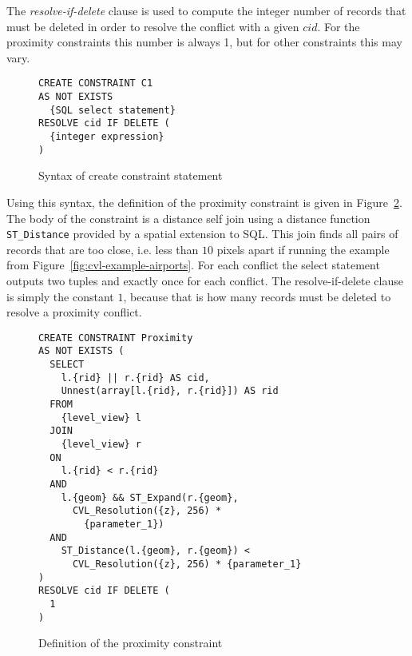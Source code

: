 The \emph{resolve-if-delete} clause is used to compute the integer number of records that must be deleted in order to resolve the conflict with a given $cid$. For the proximity constraints this number is always 1, but for other constraints this may vary.

\begin{figure}[htbp]
\begin{center}
\begin{lstlisting}
CREATE CONSTRAINT C1
AS NOT EXISTS
  {SQL select statement}
RESOLVE cid IF DELETE (
  {integer expression}
)
\end{lstlisting}
\caption{Syntax of create constraint statement}
\label{fig:create-constraint-syntax}
\end{center}
\end{figure}

Using this syntax, the definition of the proximity constraint is given in Figure~\ref{fig:proximity-definition}. The body of the constraint is a distance self join using a distance function \texttt{ST\_Distance} provided by a spatial extension to SQL. This join finds all pairs of records that are too close, i.e. less than $10$ pixels apart if running the example from Figure~\ref{fig:cvl-example-airports}. For each conflict the select statement outputs two tuples and exactly once for each conflict. The resolve-if-delete clause is simply the constant $1$, because that is how many records must be deleted to resolve a proximity conflict.

\begin{figure}[htbp]
\begin{center}
\begin{lstlisting}
CREATE CONSTRAINT Proximity
AS NOT EXISTS (
  SELECT 
    l.{rid} || r.{rid} AS cid,
    Unnest(array[l.{rid}, r.{rid}]) AS rid
  FROM
    {level_view} l
  JOIN
    {level_view} r
  ON
    l.{rid} < r.{rid}
  AND
    l.{geom} && ST_Expand(r.{geom}, 
      CVL_Resolution({z}, 256) * 
        {parameter_1})
  AND
    ST_Distance(l.{geom}, r.{geom}) <
      CVL_Resolution({z}, 256) * {parameter_1}
)
RESOLVE cid IF DELETE (
  1
)
\end{lstlisting}
\caption{Definition of the proximity constraint}
\label{fig:proximity-definition}
\end{center}
\end{figure}

